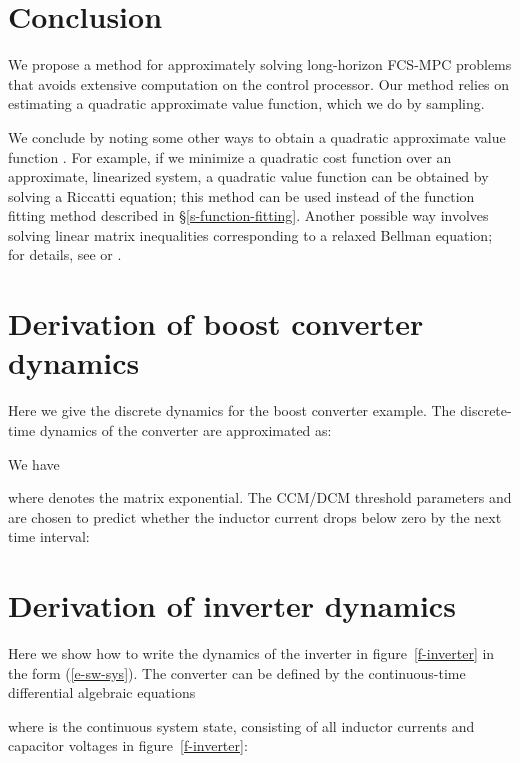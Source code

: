 \documentclass[12pt]{article}
\begin{document}
\section{Conclusion}
\label{s-conclucion}
We propose a method for approximately solving long-horizon FCS-MPC
problems that avoids extensive computation on the control processor.
Our method relies on estimating a quadratic approximate value function,
which we do by sampling.

We conclude by noting some other ways to obtain 
a quadratic approximate value function .
For example, if we minimize a quadratic cost function
over an approximate, linearized system,
a quadratic value function can be obtained by solving a Riccatti equation;
this method can be used instead of the function fitting method described in 
\S\ref{s-function-fitting}.
Another possible way involves solving linear matrix inequalities
corresponding to a relaxed Bellman equation;
for details, see \cite{rantzer2006relaxed} or \cite{wang2015approximate}.

\appendix

\clearpage



\clearpage
\section{Derivation of boost converter dynamics}
\label{s-boost-derivation}




Here we give the discrete dynamics for the boost converter example.
The discrete-time dynamics of the converter are approximated as:

We have

where  denotes the matrix exponential.
The CCM/DCM threshold parameters  and  are chosen
to predict whether the inductor current drops below zero by the next time interval:



\section{Derivation of inverter dynamics}
\label{s-inverter-derivation}
Here we show how to write the dynamics of the inverter in figure~\ref{f-inverter} 
in the form (\ref{e-sw-sys}).
The converter can be defined by the continuous-time differential algebraic equations

where  is the continuous system state,
consisting of all inductor currents and capacitor voltages in 
figure~\ref{f-inverter}:
\end{document}
